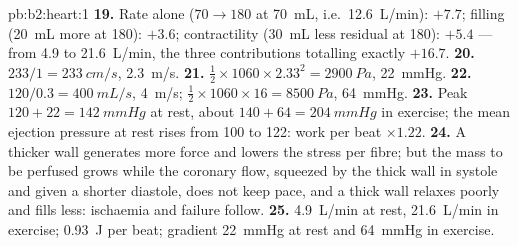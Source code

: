 \begin{solution}{pb:b2:heart:1}
\textbf{19.} Rate alone ($70 \to 180$ at \qty{70}{mL}, i.e.\
\qty{12.6}{L/min}): $+7.7$; filling (\qty{20}{mL} more at 180):
$+3.6$; contractility (\qty{30}{mL} less residual at 180): $+5.4$ ---
from 4.9 to \qty{21.6}{L/min}, the three contributions totalling
exactly $+16.7$.
\textbf{20.} $233/1 = \qty{233}{cm/s}$, \qty{2.3}{m/s}.
\textbf{21.} $\tfrac12\times 1060\times 2.33^{2} = \qty{2900}{Pa}$,
\qty{22}{mmHg}.
\textbf{22.} $120/0.3 = \qty{400}{mL/s}$, \qty{4}{m/s}; $\tfrac12\times
1060\times 16 = \qty{8500}{Pa}$, \qty{64}{mmHg}.
\textbf{23.} Peak $120 + 22 = \qty{142}{mmHg}$ at rest, about $140 +
64 = \qty{204}{mmHg}$ in exercise; the mean ejection pressure at
rest rises from 100 to 122: work per beat $\times 1.22$.
\textbf{24.} A thicker wall generates more force and lowers the
stress per fibre; but the mass to be perfused grows while the
coronary flow, squeezed by the thick wall in systole and given a
shorter diastole, does not keep pace, and a thick wall relaxes
poorly and fills less: ischaemia and failure follow.
\textbf{25.} \qty{4.9}{L/min} at rest, \qty{21.6}{L/min} in exercise;
\qty{0.93}{J} per beat; gradient \qty{22}{mmHg} at rest and
\qty{64}{mmHg} in exercise.
\end{solution}
